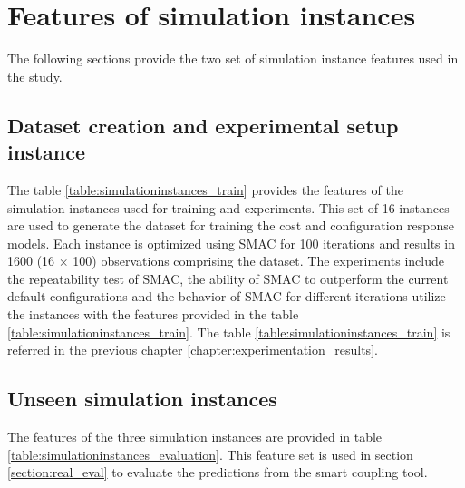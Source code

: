 
\chapter{Features of simulation instances}
\label{appendix:features}

The following sections provide the two set of simulation instance features used in the study.

\section{Dataset creation and experimental setup instance}
\label{section:feature_table_training}
The table \ref{table:simulationinstances_train} provides the features of the simulation instances used for training and experiments. This set of 16 instances are used to generate the dataset for training the cost and configuration response models. Each instance is optimized using SMAC for 100 iterations and results in  1600 (16 $\times$ 100) observations comprising the dataset. The experiments include the repeatability test of SMAC, the ability of SMAC to outperform the current default configurations and the behavior of SMAC for different iterations utilize the instances with the features provided in the table \ref{table:simulationinstances_train}. The table \ref{table:simulationinstances_train} is referred in the previous chapter \ref{chapter:experimentation_results}.

\section{Unseen simulation instances}
\label{section:feature_table_evaluation}

The features of the three simulation instances are provided in table \ref{table:simulationinstances_evaluation}. This feature set is used in section \ref{section:real_eval} to evaluate the predictions from the smart coupling tool.


